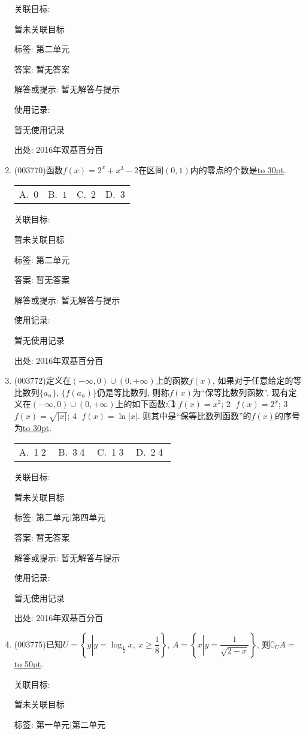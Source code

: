 \documentclass[10pt,a4paper]{article}
\newcommand{\blank}[1]{\underline{\hbox to #1pt{}}}
\newcommand{\fourch}[4]{\par\begin{tabular}{p{.23\textwidth}p{.23\textwidth}p{.23\textwidth}p{.23\textwidth}}
A.~#1 &B.~#2& C.~#3& D.~#4
\end{tabular}}
\begin{document}
\begin{enumerate}[1.]
关联目标:

暂未关联目标



标签: 第二单元

答案: 暂无答案

解答或提示: 暂无解答与提示

使用记录:

暂无使用记录


出处: 2016年双基百分百
\item { (003770)}函数$f(x)=2^x+x^3-2$在区间$(0,1)$内的零点的个数是\blank{30}.
\fourch{$0$}{$1$}{$2$}{$3$}


关联目标:

暂未关联目标



标签: 第二单元

答案: 暂无答案

解答或提示: 暂无解答与提示

使用记录:

暂无使用记录


出处: 2016年双基百分百
\item { (003772)}定义在$(-\infty,0)\cup (0,+\infty)$上的函数$f(x)$, 如果对于任意给定的等比数列$\{a_n\}$, $\{f(a_n)\}$仍是等比数列, 则称$f(x)$为``保等比数列函数''. 现有定义在$(-\infty,0)\cup (0,+\infty)$上的如下函数: \textcircled{1} $f(x)=x^2$; \textcircled{2} $f(x)=2^x$; \textcircled{3} $f(x)=\sqrt{|x|}$; \textcircled{4} $f(x)=\ln|x|$. 则其中是``保等比数列函数''的$f(x)$的序号为\blank{30}.
\fourch{\textcircled{1}\textcircled{2}}{\textcircled{3}\textcircled{4}}{\textcircled{1}\textcircled{3}}{\textcircled{2}\textcircled{4}}


关联目标:

暂未关联目标



标签: 第二单元|第四单元

答案: 暂无答案

解答或提示: 暂无解答与提示

使用记录:

暂无使用记录


出处: 2016年双基百分百
\item { (003775)}已知$U=\left\{y\left|y=\log_\frac 12 x, \ x\ge \dfrac 18\right.\right\}$, $A=\left\{x\left|y=\dfrac{1}{\sqrt{2-x}}\right.\right\}$, 则$\complement_U A=$\blank{50}.


关联目标:

暂未关联目标



标签: 第一单元|第二单元


\end{enumerate}
\end{document}
